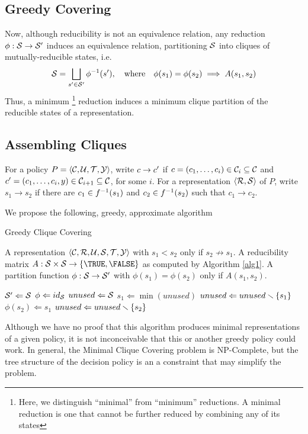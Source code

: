 \subsection{Greedy Covering}

Now, although reducibility is not an equivalence relation, 
any reduction $\phi:\S\to\S\1$ induces an equivalence relation,
partitioning $\S$ into cliques of mutually-reducible states, i.e.
\begin{equation}
\S = \bigsqcup_{s\1\in\S\1}\phi\inv(s\1),\qtx{where}\phi(s_1)=\phi(s_2)\implies A(s_1,s_2)
\end{equation}
Thus, a minimum 
\footnote{Here, we distinguish ``minimal'' from ``minimum'' reductions.  A minimal reduction is one that cannot be further reduced by combining any of its states} 
reduction
induces a minimum clique partition of the
reducible states of a representation.
\subsection{Assembling Cliques}
\begin{notation}
For a policy $P=\ang{\C,\U,\T,\Y}$, 
write $c\to c\1$ if $c=(c_1,\ldots,c_i)\in\C_i\subseteq\C$ and 
$c\1=(c_1,\ldots,c_i,y)\in\C_{i+1}\subseteq\C$, for some $i$.  For a representation $\ang{\R,\S}$ of $P$,
write $s_1\to s_2$ if there are $c_1\in f\inv(s_1)$ and $c_2\in f\inv(s_2)$ such that $c_1\to c_2$.
\end{notation}
We propose the following, greedy, approximate algorithm
\begin{algorithm}                      %
\caption{Greedy Clique Covering}          %
\label{alg2}                           %
\begin{algorithmic}                    %
  \REQUIRE A representation $\ang{\C,\R,\U,\S,\T,\Y}$ with $s_1<s_2$ only if $s_2\not\to s_1$.
  \REQUIRE A reducibility matrix $A:\S\times\S\to\{\TRUE,\FALSE\}$ as computed by Algorithm \ref{alg1}.
  \ENSURE A partition function $\phi:\S\to\S\1$ with $\phi(s_1)=\phi(s_2)$ only if $A(s_1,s_2)$.
  \bigskip
  
  \STATE $\S\1\Leftarrow\S$
  \STATE $\phi\Leftarrow id_{\S}$
  \STATE $unused\Leftarrow\S$
	\STATE $s_1\Leftarrow\min(unused)$
	\STATE $unused\Leftarrow unused\andn\{s_1\}$
		\STATE $\phi(s_2)\Leftarrow s_1$
		\STATE $unused\Leftarrow unused\andn\{s_2\}$
	  \ENDIF
	\ENDFOR
  \ENDWHILE
\end{algorithmic}
\end{algorithm}
Although we have no proof that this algorithm produces minimal representations
of a given policy, it is not inconceivable that this or another greedy policy could work.
In general, the Minimal Clique Covering problem is NP-Complete, 
but the tree structure of the decision policy is an a constraint that may simplify the problem.

